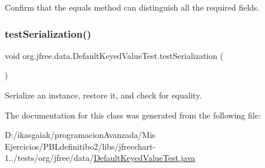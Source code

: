 Confirm that the equals method can distinguish all the required fields. \mbox{\label{classorg_1_1jfree_1_1data_1_1_default_keyed_value_test_a4875655f57cd7f96222ca2f6d03873ea}} 
\subsubsection{\texorpdfstring{test\+Serialization()}{testSerialization()}}
{\footnotesize\ttfamily void org.\+jfree.\+data.\+Default\+Keyed\+Value\+Test.\+test\+Serialization (\begin{DoxyParamCaption}{ }\end{DoxyParamCaption})}

Serialize an instance, restore it, and check for equality. 

The documentation for this class was generated from the following file\+:\begin{DoxyCompactItemize}
\item 
D\+:/ikasgaiak/programacion\+Avanzada/\+Mis Ejercicios/\+P\+B\+Ldefinitibo2/libs/jfreechart-\/1../tests/org/jfree/data/\mbox{\hyperlink{_default_keyed_value_test_8java}{Default\+Keyed\+Value\+Test.\+java}}\end{DoxyCompactItemize}
